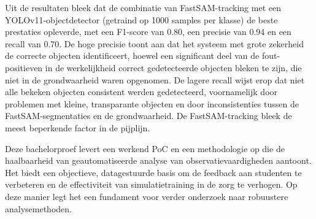 Uit de resultaten bleek dat de combinatie van FastSAM-tracking met een YOLOv11-objectdetector (getraind op 1000 samples per klasse) 
de beste prestaties opleverde, met een F1-score van 0.80, een precisie van 0.94 en een recall van 0.70. 
De hoge precisie toont aan dat het systeem met grote zekerheid de correcte objecten identificeert, 
hoewel een significant deel van de fout-positieven in de werkelijkheid correct gedetecteerde objecten bleken te zijn, die niet in de grondwaarheid waren opgenomen. 
De lagere recall wijst erop dat niet alle bekeken objecten consistent werden gedetecteerd, voornamelijk door problemen met kleine, 
transparante objecten en door inconsistenties tussen de FastSAM-segmentaties en de grondwaarheid. 
De FastSAM-tracking bleek de meest beperkende factor in de pijplijn.

Deze bachelorproef levert een werkend PoC en een methodologie op die de haalbaarheid van geautomatiseerde 
analyse van observatievaardigheden aantoont.\\
Het biedt een objectieve, datagestuurde basis om de feedback aan studenten te verbeteren en de effectiviteit van simulatietraining in de zorg te verhogen.
Op deze manier legt het een fundament voor verder onderzoek naar robuustere analysemethoden.